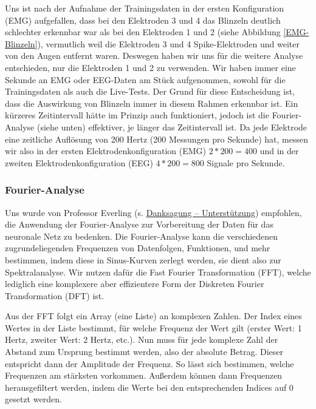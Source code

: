 \documentclass[11pt]{scrartcl}
\begin{document}
	Uns ist nach der Aufnahme der Trainingsdaten in der ersten Konfiguration (EMG) aufgefallen, dass bei den Elektroden 3 und 4 das Blinzeln deutlich schlechter erkennbar war als bei den Elektroden 1 und 2 (siehe Abbildung \ref{EMG-Blinzeln}), vermutlich weil die Elektroden 3 und 4 Spike-Elektroden und weiter von den Augen entfernt waren.
	Deswegen haben wir uns für die weitere Analyse entschieden, nur die Elektroden 1 und 2 zu verwenden.
	Wir haben immer eine Sekunde an EMG oder EEG-Daten am Stück aufgenommen, sowohl für die Trainingsdaten als auch die Live-Tests. Der Grund für diese Entscheidung ist, dass die Auswirkung von Blinzeln immer in diesem Rahmen erkennbar ist. Ein kürzeres Zeitintervall hätte im Prinzip auch funktioniert,
	jedoch ist die Fourier-Analyse (siehe unten) effektiver, je länger das Zeitintervall ist.
	Da jede Elektrode eine zeitliche Auflösung von 200 Hertz (200 Messungen pro Sekunde) hat, messen wir also in der ersten Elektrodenkonfiguration (EMG) $2 * 200 = 400$ und in der zweiten Elektrodenkonfiguration (EEG) $4 * 200 = 800$ Signale pro Sekunde.

	\subsubsection{Fourier-Analyse}
	
	Uns wurde von Professor Everling (s. \hyperref[Unterstuetzung]{Danksagung -- Unterstützung}) empfohlen, die Anwendung der Fourier-Analyse zur Vorbereitung der Daten für das neuronale Netz zu bedenken. Die Fourier-Analyse kann die verschiedenen zugrundeliegenden Frequenzen von Datenfolgen, Funktionen, und mehr bestimmen, indem diese in Sinus-Kurven zerlegt werden, sie dient also zur Spektralanalyse. \cite{3b1b:fft} Wir nutzen dafür die Fast Fourier Transformation (FFT), welche lediglich eine komplexere aber effizientere Form der Diskreten Fourier Transformation (DFT) ist. \cite{FFT-DFT}

	Aus der FFT folgt ein Array (eine Liste) an komplexen Zahlen. Der Index eines Wertes in der Liste bestimmt, für welche Frequenz der Wert gilt (erster Wert: 1 Hertz, zweiter Wert: 2 Hertz, etc.). Nun muss für jede komplexe Zahl der Abstand zum Ursprung bestimmt werden, also der absolute Betrag. Dieser entspricht dann der Amplitude der Frequenz. So lässt sich bestimmen, welche Frequenzen am stärksten vorkommen. Außerdem können dann Frequenzen herausgefiltert werden, indem die Werte bei den entsprechenden Indices auf 0 gesetzt werden. 
\end{document}
